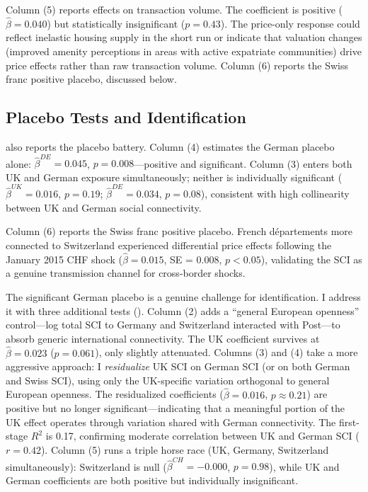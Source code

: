 \documentclass[12pt]{article}
\begin{document}
Column (5) reports effects on transaction volume. The coefficient is positive ($\hat{\beta} = 0.040$) but statistically insignificant ($p = 0.43$). The price-only response could reflect inelastic housing supply in the short run or indicate that valuation changes (improved amenity perceptions in areas with active expatriate communities) drive price effects rather than raw transaction volume. Column (6) reports the Swiss franc positive placebo, discussed below.



\subsection{Placebo Tests and Identification}

 also reports the placebo battery. Column (4) estimates the German placebo alone: $\hat{\beta}^{DE} = 0.045$, $p = 0.008$---positive and significant. Column (3) enters both UK and German exposure simultaneously; neither is individually significant ($\hat{\beta}^{UK} = 0.016$, $p = 0.19$; $\hat{\beta}^{DE} = 0.034$, $p = 0.08$), consistent with high collinearity between UK and German social connectivity.

Column (6) reports the Swiss franc positive placebo. French d\'epartements more connected to Switzerland experienced differential price effects following the January 2015 CHF shock ($\hat{\beta} = 0.015$, SE = 0.008, $p < 0.05$), validating the SCI as a genuine transmission channel for cross-border shocks.

The significant German placebo is a genuine challenge for identification. I address it with three additional tests (). Column (2) adds a ``general European openness'' control---log total SCI to Germany and Switzerland interacted with Post---to absorb generic international connectivity. The UK coefficient survives at $\hat{\beta} = 0.023$ ($p = 0.061$), only slightly attenuated. Columns (3) and (4) take a more aggressive approach: I \textit{residualize} UK SCI on German SCI (or on both German and Swiss SCI), using only the UK-specific variation orthogonal to general European openness. The residualized coefficients ($\hat{\beta} = 0.016$, $p \approx 0.21$) are positive but no longer significant---indicating that a meaningful portion of the UK effect operates through variation shared with German connectivity. The first-stage $R^2$ is 0.17, confirming moderate correlation between UK and German SCI ($r = 0.42$). Column (5) runs a triple horse race (UK, Germany, Switzerland simultaneously): Switzerland is null ($\hat{\beta}^{CH} = -0.000$, $p = 0.98$), while UK and German coefficients are both positive but individually insignificant.
\end{document}
